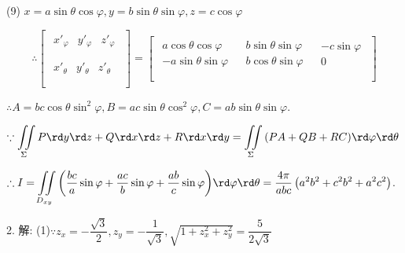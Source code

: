   (9) $x=a\sin \theta \cos \varphi ,y=b\sin \theta \sin \varphi ,z=c\cos \varphi $

  \[\therefore \left[ \begin{matrix}
     \begin{matrix}
     x{{'}_{\varphi }} & y{{'}_{\varphi }} & z{{'}_{\varphi }}  \\
  \end{matrix}  \\
     \begin{matrix}
     x{{'}_{\theta }} & y{{'}_{\theta }} & z{{'}_{\theta }}  \\
  \end{matrix}  \\
  \end{matrix} \right]=\left[ \begin{matrix}
     \begin{matrix}
     a\cos \theta \cos \varphi   \\
     -a\sin \theta \sin \varphi   \\
  \end{matrix} & \begin{matrix}
     b\sin \theta \sin \varphi   \\
     b\cos \theta \sin \varphi   \\
  \end{matrix} & \begin{matrix}
     -c\sin \varphi   \\
     0  \\
  \end{matrix}  \\
  \end{matrix} \right]\]

  $\therefore A=bc\cos \theta {{\sin }^{2}}\varphi ,B=ac\sin \theta {{\cos }^{2}}\varphi ,C=ab\sin \theta \sin \varphi $.

  $\because \displaystyle\iint\limits  \limits_{\Sigma} {P\rd y \rd z +Q\rd x\rd z+R\rd x\rd y=\iint\limits\limits  \limits_{\Sigma} {\left( PA+QB+RC \right)}}\rd \varphi \rd \theta $

  $\therefore I=\displaystyle\iint\limits _{ D_{xy} }{\left( \dfrac{bc}{a}\sin \varphi +\dfrac{ac}{b}\sin \varphi +\dfrac{ab}{c}\sin \varphi  \right)}\rd \varphi \rd \theta =\dfrac{4\pi }{abc}\left( {{a}^{2}}{{b}^{2}}+{{c}^{2}}{{b}^{2}}+{{a}^{2}}{{c}^{2}} \right)$.

  2. 解: (1)$\because {{z}_{x}}=-\dfrac{\sqrt{3}}{2},{{z}_{y}}=-\dfrac{1}{\sqrt{3}},\sqrt{1+z_{x}^{2}+z_{y}^{2}}=\dfrac{5}{2\sqrt{3}}$

